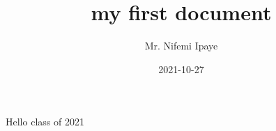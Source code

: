 \documentclass{article}
\title{my first document}
\date{2021-10-27}
\author{Mr. Nifemi Ipaye}
\begin{document}
	\maketitle
	\newpage
	Hello class of 2021
\end{document}
